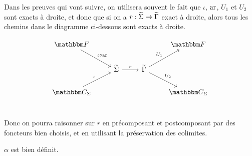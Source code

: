 \begin{rem}
    Dans les preuves qui vont suivre, on utilisera souvent le fait que $\iota$, $\text{ar}$,
    $U_1$ et $U_2$ sont exacts à droite, et donc que si on a
    $r : \widetilde{\Sigma}\rightarrow\widetilde{\Gamma}$ exact à droite, alors tous les chemins dans le
    diagramme ci-dessous sont exacts à droite.
    
    \[\begin{tikzcd}
        \cf\arrow[dr, "\iota\circ\arf"] & & & \cf \\
        & \tsigma\arrow[r, "r"] & \tgamma\arrow[ur, "U_1"]\arrow[dr, "U_2"] & \\
        \C_\Sigma\arrow[ur, "\iota"] & & & \C_\Sigma \\
    \end{tikzcd}\]

    Donc on pourra raisonner sur $r$ en précomposant et postcomposant par des foncteurs
    bien choisis, et en utilisant la préservation des colimites.
\end{rem}

\begin{prop}
    $\alpha$ est bien définit.
\end{prop}

